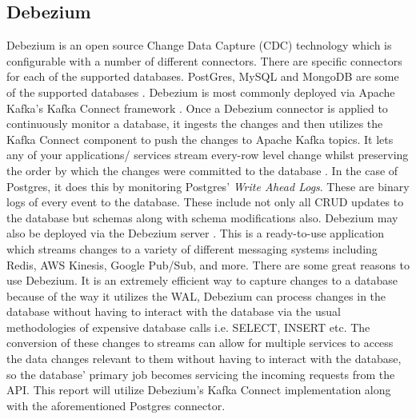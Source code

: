 \begin{flushleft}
	\subsection{Debezium}
	Debezium is an open source Change Data Capture (CDC) technology which is configurable with a number of different connectors. There are specific connectors for each of the supported databases.
	PostGres, MySQL and MongoDB are some of the supported databases \autocite{ConnectorsDebeziumDocumentation}.\newline
	Debezium is most commonly deployed via Apache Kafka's Kafka Connect framework \autocite{KafkaConnectConfluent}. Once a Debezium connector is applied to continuously monitor a database, it ingests the changes and then
	utilizes the Kafka Connect component to push the changes to Apache Kafka topics. It lets any of your applications/ services stream every-row level change whilst preserving the order by which
	the changes were committed to the database \autocite{debeziumcommunityDebezium}. In the case of Postgres, it does this by monitoring Postgres' \emph{Write Ahead Logs}. These are binary logs
	of every event to the database. These include not only all CRUD updates to the database but schemas along with schema modifications also.
	\bigbreak
	Debezium may also be deployed via the Debezium server \autocite{DebeziumArchitectureDebezium}. This is a ready-to-use application which streams changes to a variety of different messaging systems including Redis, AWS Kinesis, Google Pub/Sub,
	and more.
	\bigbreak
	There are some great reasons to use Debezium. It is an extremely efficient way to capture changes to a database because of the way it utilizes the WAL, Debezium can process changes in the database without having to
	interact with the database via the usual methodologies of expensive	database calls i.e. SELECT, INSERT etc. \newline
	The conversion of these changes to streams can allow for multiple services to access the data changes relevant to them without having to interact with the database, so the database' primary job
	becomes servicing the incoming requests from the API.
	\bigbreak
	This report will utilize Debezium's Kafka Connect implementation along with the aforementioned Postgres connector.

\end{flushleft}
